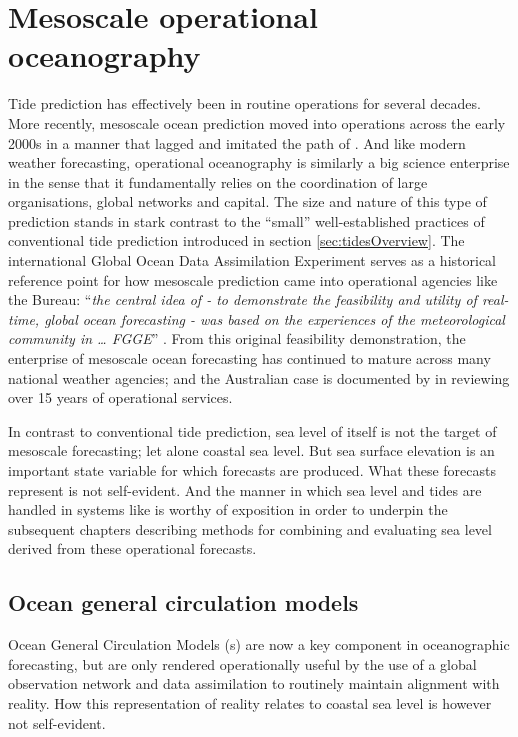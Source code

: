 \section{Mesoscale operational oceanography}
\label{sec:operational_oceanography}
Tide prediction has effectively been in routine operations for several decades.
More recently, mesoscale ocean prediction moved into operations across the early 2000s in a manner that lagged and imitated the path of \NWP \citep{Harper:2008ub}. And like modern weather forecasting, operational oceanography is similarly a big science enterprise \citep{Petersen:2012tr} in the sense that it fundamentally relies on the coordination of large organisations, global networks and capital. 
The size and nature of this type of prediction stands in stark contrast to the ``small'' well-established practices of conventional tide prediction introduced in section \ref{sec:tidesOverview}.
The international Global Ocean Data Assimilation Experiment \GODAE{} serves as a historical reference point for how mesoscale prediction came into operational agencies like the Bureau:
``\textit{the central idea of \GODAE{} - to demonstrate the feasibility and utility of real-time, global ocean forecasting - was based on the experiences of the meteorological community in \dots{} FGGE}'' \citep{Bell:2009uv}.
From this original feasibility demonstration, the enterprise of mesoscale ocean forecasting has continued to mature across many national weather agencies; and the Australian case is documented by \cite{10.1080/1755876x.2019.1685834} in reviewing over 15 years of operational services.


In contrast to conventional tide prediction, sea level of itself is not the target of mesoscale forecasting; let alone coastal sea level.   But sea surface elevation is an important state variable for which forecasts are produced.  What these forecasts represent is not self-evident. And the manner in which sea level and tides are handled in systems like \BL{} is worthy of exposition in order to underpin the subsequent chapters describing methods for combining and evaluating sea level derived from these operational forecasts. 
  
\subsection{Ocean general circulation models}
Ocean General Circulation Models (\OGCM{}s) are now a key component in oceanographic forecasting, but are only rendered operationally useful by the use of a global observation network and data assimilation to routinely maintain alignment with reality.
How this representation of reality relates to coastal sea level is however not self-evident.



